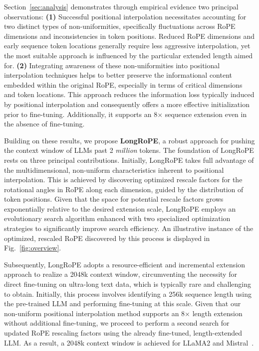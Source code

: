 Section~\ref{sec:analysis} demonstrates through empirical evidence two principal observations: \textbf{(1)} Successful positional interpolation necessitates accounting for two distinct types of non-uniformities, specifically fluctuations across RoPE dimensions and inconsistencies in token positions. Reduced RoPE dimensions and early sequence token locations generally require less aggressive interpolation, yet the most suitable approach is influenced by the particular extended length aimed for.  
\textbf{(2)} Integrating awareness of these non-uniformities into positional interpolation techniques helps to better preserve the informational content embedded within the original RoPE, especially in terms of critical dimensions and token locations. This approach reduces the information loss typically induced by positional interpolation and consequently offers a more effective initialization prior to fine-tuning. Additionally, it supports an 8$\times$ sequence extension even in the absence of fine-tuning.

Building on these results, we propose \textbf{LongRoPE}, a robust approach for pushing the context window of LLMs past 2 \emph{million} tokens. The foundation of LongRoPE rests on three principal contributions. Initially, {LongRoPE} takes full advantage of the multidimensional, non-uniform characteristics inherent to positional interpolation. This is achieved by discovering optimized rescale factors for the rotational angles in RoPE along each dimension, guided by the distribution of token positions. Given that the space for potential rescale factors grows exponentially relative to the desired extension scale, {LongRoPE} employs an evolutionary search algorithm enhanced with two specialized optimization strategies to significantly improve search efficiency. An illustrative instance of the optimized, rescaled RoPE discovered by this process is displayed in Fig.~\ref{fig:overview}.

Subsequently, {LongRoPE} adopts a resource-efficient and incremental extension approach to realize a 2048k context window, circumventing the necessity for direct fine-tuning on ultra-long text data, which is typically rare and challenging to obtain. Initially, this process involves identifying a 256k sequence length using the pre-trained LLM and performing fine-tuning at this scale. Given that our non-uniform positional interpolation method supports an 8$\times$ length extension without additional fine-tuning, we proceed to perform a second search for updated RoPE rescaling factors using the already fine-tuned, length-extended LLM. As a result, a 2048k context window is achieved for LLaMA2 and Mistral~\cite{mistral}.

